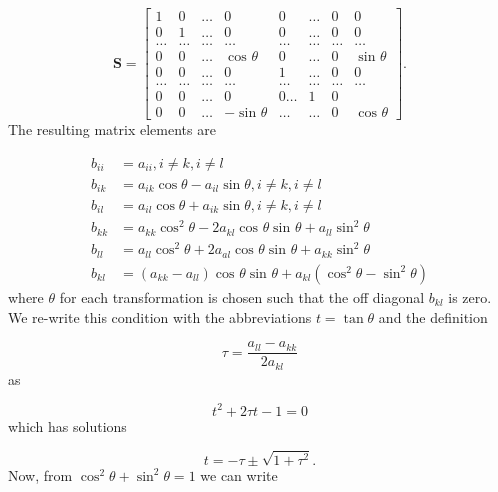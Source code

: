 \documentclass[10pt,showpacs,preprintnumbers,footinbib,amsmath,amssymb,aps,prl,twocolumn,groupedaddress,superscriptaddress,showkeys]{revtex4-1}
\newcommand{\costa}[1]{%
	\ensuremath{\cos ^{#1} {\theta}} }
\newcommand{\sinta}[1]{%
	\ensuremath{\sin ^{#1} {\theta}} }
\begin{document}
{\begin{equation*}
	\mathbf{S} = 
	\begin{bmatrix}1 & 0 & \dots   & 0    & 0  & \dots  & 0 & 0 \\
                                0 & 1 & \dots & 0    & 0  & \dots     &0 & 0 \\
			\dots & \dots & \dots & \dots & \dots & \dots & \dots & \dots\\
                                0 & 0 & \dots & \costa{}  & 0   & \dots & 0 & \sinta{} \\
			0 & 0 & \dots & 0 & 1 & \dots & 0 & 0 \\
			\dots & \dots & \dots & \dots & \dots & \dots & \dots & \dots\\
                                0   & 0 & \dots & 0  & 0  \dots  & 1 & 0\\
                                0   & 0 & \dots & - \sinta{}  &\dots & \dots & 0 & \costa{}
	\end{bmatrix}
	.
\end{equation*}
The resulting matrix elements are

\begin{align*}
	b _{ii}  &= a _{ii}, i \neq k, i \neq l\\
	b _{ik} &= a _{ik} \cos{\theta} - a _{il} \sin{\theta}, i \neq k, i \neq l\\
	b _{il}  &= a _{il} \cos{\theta} + a _{ik} \sin{\theta}, i \neq k, i \neq l\\
	b _{kk} &= a _{kk} \costa{2} - 2 a_{kl} \costa{} \sinta{} + a _{ll} \sinta{2}\\
	b _{ll}  &= a _{ll} \costa{2} + 2 a _{al} \costa{} \sinta{} + a _{kk} \sinta{2}\\
	b _{kl} &= (a _{kk} - a _{ll} ) \costa{} \sinta{} + a _{kl} (\costa{2} - \sinta{2} )
\end{align*}
where $\theta$ for each transformation is chosen such that the off diagonal $b _{kl}$
is zero. We re-write this condition with the abbreviations $t = \tan{\theta}$ and the
definition

\begin{equation*}
	\tau = \frac{a _{ll} - a _{kk}}{2 a _{kl}}
\end{equation*}
as

\begin{equation*}
	t ^2  + 2 \tau t - 1 = 0
\end{equation*}
which has solutions

\begin{equation*}
	t = - \tau \pm \sqrt{1 + \tau ^2}.
\end{equation*}
Now, from $\costa{2} + \sinta{2} = 1$ we can write

}
\end{document}
